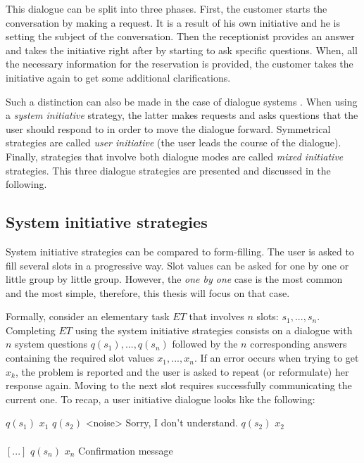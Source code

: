 	This dialogue can be split into three phases. First, the customer starts the conversation by making a request. It is a result of his own initiative and he is setting the subject of the conversation. Then the receptionist provides an answer and takes the initiative right after by starting to ask specific questions. When, all the necessary information for the reservation is provided, the customer takes the initiative again to get some additional clarifications.
	
	Such a distinction can also be made in the case of dialogue systems \cite{Ferguson2007}. When using a \textit{system initiative} strategy, the latter makes requests and asks questions that the user should respond to in order to move the dialogue forward. Symmetrical strategies are called \textit{user initiative} (the user leads the course of the dialogue). Finally, strategies that involve both dialogue modes are called \textit{mixed initiative} strategies. This three dialogue strategies are presented and discussed in the following.
	
	\subsection{System initiative strategies}
	
		System initiative strategies can be compared to form-filling. The user is asked to fill several slots in a progressive way. Slot values can be asked for one by one or little group by little group. However, the \textit{one by one} case is the most common and the most simple, therefore, this thesis will focus on that case.
		
		Formally, consider an elementary task $ET$ that involves $n$ slots: $s_1, ..., s_n$. Completing $ET$ using the system initiative strategies consists on a dialogue with $n$ system questions $q(s_1),...,q(s_n)$ followed by the $n$ corresponding answers containing the required slot values $x_1,...,x_n$. If an error occurs when trying to get $x_k$, the problem is reported and the user is asked to repeat (or reformulate) her response again. Moving to the next slot requires successfully communicating the current one. To recap, a user initiative dialogue looks like the following:
		
		\begin{dialogue}
			 $q(s_1)$
			 $x_1$
			 $q(s_2)$
			 Sorry, I don't understand. $q(s_2)$
			 $x_2$ \\ \\ $[...]$
			 $q(s_n)$
			 $x_n$
			 Confirmation message
		\end{dialogue}
		
